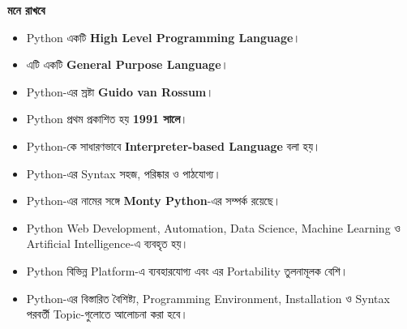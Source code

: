 \begin{rememberbox}

\textbf{\color{deepOrange}মনে রাখবে}

\begin{itemize}

\item Python একটি \textbf{High Level Programming Language}।

\item এটি একটি \textbf{General Purpose Language}।

\item Python-এর স্রষ্টা \textbf{Guido van Rossum}।

\item Python প্রথম প্রকাশিত হয় \textbf{1991 সালে}।

\item Python-কে সাধারণভাবে
\textbf{Interpreter-based Language} বলা হয়।

\item Python-এর Syntax সহজ, পরিষ্কার ও পাঠযোগ্য।

\item Python-এর নামের সঙ্গে \textbf{Monty Python}-এর সম্পর্ক রয়েছে।

\item Python Web Development, Automation, Data Science,
Machine Learning ও Artificial Intelligence-এ ব্যবহৃত হয়।

\item Python বিভিন্ন Platform-এ ব্যবহারযোগ্য এবং এর
Portability তুলনামূলক বেশি।

\item Python-এর বিস্তারিত বৈশিষ্ট্য, Programming Environment,
Installation ও Syntax পরবর্তী Topic-গুলোতে আলোচনা করা হবে।

\end{itemize}

\end{rememberbox}

\small

